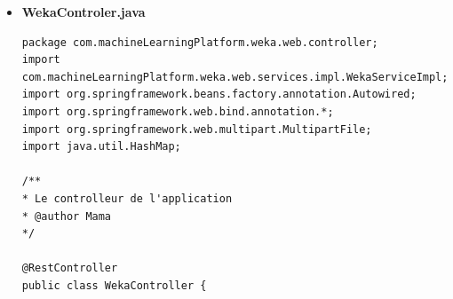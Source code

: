 \documentclass[a4paper,11pt]{article}
\begin{document}
\begin{itemize}
\begin{itemize}
\begin{verbatim}
    //Si l'algo random forest a été sélectionné
    if(rf) {
        try {
            //Si cross validation
            if(cv)
                result.put("rf", RFAlgo.process(1, train_file, test_file, nbSplits)+"");
            else
                result.put("rf", RFAlgo.process(2, train_file, test_file, nbSplits)+"");
        } catch (Exception e) {
            result.put("rf", "-1000");
            e.printStackTrace();
        }
    }
    if(nb) {
        try {
            if(cv)
                result.put("nb", NBAlgo.process(1, train_file, test_file, nbSplits)+"");
            else
                result.put("nb", NBAlgo.process(2, train_file, test_file, nbSplits)+"");
        } catch (Exception e) {
            result.put("nb", "-1000");
            e.printStackTrace();
        }
    }

    if(jr) {
        try {
            if(cv)
                result.put("jr", JRAlgo.process(1, train_file, test_file, nbSplits)+"");
            else
            result.put("jr", JRAlgo.process(2, train_file, test_file, nbSplits)+"");
        } catch (Exception e) {
            result.put("jr", "-1000");
            e.printStackTrace();
        }
    }

    return result;

    }

    public void csv2Arff(File csv, File output) throws IOException {
        CSVLoader loader = new CSVLoader();
        //On dit que la dernière colonne correspond à la classe.
        loader.setNominalAttributes("last");
        loader.setSource(csv);
        Instances data = loader.getDataSet();

        ArffSaver saver = new ArffSaver();
        saver.setInstances(data);
        saver.setFile(output);
        saver.writeBatch();
    }
}

\end{verbatim}
\item \textbf{WekaControler.java}
\begin{verbatim}
package com.machineLearningPlatform.weka.web.controller;
import com.machineLearningPlatform.weka.web.services.impl.WekaServiceImpl;
import org.springframework.beans.factory.annotation.Autowired;
import org.springframework.web.bind.annotation.*;
import org.springframework.web.multipart.MultipartFile;
import java.util.HashMap;

/**
* Le controlleur de l'application
* @author Mama
*/

@RestController
public class WekaController {


\end{verbatim}
\end{itemize}
\end{itemize}
\end{document}
